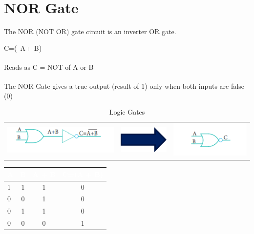 \documentclass{article}
\begin{document}
\section{NOR Gate}
\paragraph{}
The NOR (NOT OR) gate circuit is an inverter OR gate.
\begin{center}
	C=(~A+~B)
\end{center}
\paragraph{}
Reads as C = NOT of A or B
\\
\paragraph{}
The NOR Gate gives a true output (result of 1) only when both inputs are false (0)
\newpage
\begin{table}[h!]
	\begin{center}
		\caption{Logic Gates}
		\label{tab:table1}
		\begin{tabular}{l c c}
			\includegraphics[width=0.25\linewidth]{nor1}
			&
			\includegraphics[width=0.13\linewidth]{arrow}
			&
			\includegraphics[width=0.25\linewidth]{nor2}
			\\
		\end{tabular}
	\end{center}
\end{table}

\begin{table}[h!]
	\begin{center}
		\begin{tabular}{ |l|c|c|c }
			\cellcolor{blue!100}\textcolor{white}{\textbf{    A    }} & \cellcolor{blue!100}\textcolor{white}{\textbf{    B    }} & \cellcolor{blue!100}\textcolor{white}{\textbf{A + B}} &
			\cellcolor{blue!100}\textcolor{white}{\textbf{C=(A + B)}}\\
			\hline
			1 & 1 & 1 & 0\\
			0 & 0 & 1 & 0\\
			0 & 1 & 1 & 0\\
			0 & 0 & 0 & 1\\
			\hline
			
		\end{tabular}
	\end{center}
\end{table}
\end{document}
